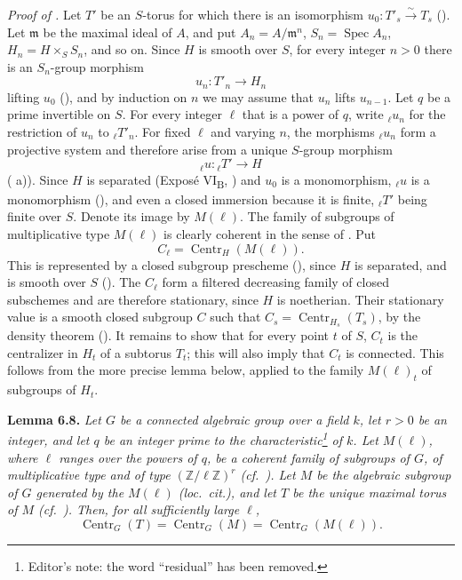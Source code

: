 \emph{Proof of .} Let \(T'\) be an \(S\)-torus for which there is an isomorphism
\(u_0:T'_s\xrightarrow{\sim}T_s\) (). Let \(\mathfrak m\) be the
maximal ideal of \(A\), and put \(A_n=A/\mathfrak m^n\),
\(S_n=\operatorname{Spec}A_n\), \(H_n=H\times_S S_n\), and so on. Since \(H\) is
smooth over \(S\), for every integer \(n>0\) there is an \(S_n\)-group morphism
\[
u_n:T'_n\longrightarrow H_n
\]
lifting \(u_0\) (), and by induction on \(n\) we may assume that
\(u_n\) lifts \(u_{n-1}\). Let \(q\) be a prime invertible on \(S\). For every
integer \(\ell\) that is a power of \(q\), write \({}_{\ell}u_n\) for the restriction
of \(u_n\) to \({}_{\ell}T'_n\). For fixed \(\ell\) and varying \(n\), the morphisms
\({}_{\ell}u_n\) form a projective system and therefore arise from a unique
\(S\)-group morphism
\[
{}_{\ell}u:{}_{\ell}T'\longrightarrow H
\]
( a)). Since \(H\) is separated (Exposé VI\textsubscript{B}, ) and \(u_0\) is
a monomorphism, \({}_{\ell}u\) is a monomorphism (), and even a closed
immersion because it is finite, \({}_{\ell}T'\) being finite over \(S\). Denote its
image by \(M(\ell)\). The family of subgroups of multiplicative type \(M(\ell)\) is
clearly coherent in the sense of . Put
\[
C_\ell=\operatorname{Centr}_H(M(\ell)).
\]
This is represented by a closed subgroup prescheme (), since \(H\) is separated,
and is smooth over \(S\) (). The \(C_\ell\) form a filtered decreasing
family of closed subschemes and are therefore stationary, since \(H\) is noetherian.
Their stationary value is a smooth closed subgroup \(C\) such that
\(C_s=\operatorname{Centr}_{H_s}(T_s)\), by the density theorem ().
It remains to show that for every point \(t\) of \(S\), \(C_t\) is the centralizer
in \(H_t\) of a subtorus \(T_t\); this will also imply that \(C_t\) is connected.
This follows from the more precise lemma below, applied to the family
\(M(\ell)_t\) of subgroups of \(H_t\).

\textbf{Lemma 6.8.} \emph{Let \(G\) be a connected algebraic group over a field
\(k\), let \(r>0\) be an integer, and let \(q\) be an integer prime to the
characteristic\footnote{Editor's note: the word ``residual'' has been removed.}
of \(k\). Let \(M(\ell)\), where \(\ell\) ranges over the powers of \(q\), be a
coherent family of subgroups of \(G\), of multiplicative type and of type
\((\mathbb Z/\ell\mathbb Z)^r\) (cf.~). Let \(M\) be the algebraic subgroup of
\(G\) generated by the \(M(\ell)\) (\emph{loc.~cit.}), and let \(T\) be the unique
maximal torus of \(M\) (cf.~). Then, for all sufficiently large \(\ell\),
\[
\operatorname{Centr}_G(T)=\operatorname{Centr}_G(M)
  =\operatorname{Centr}_G(M(\ell)).
\]}

